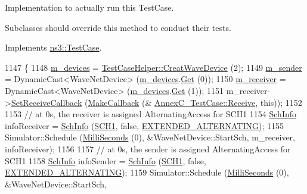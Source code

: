 Implementation to actually run this Test\+Case. 

Subclasses should override this method to conduct their tests. 

Implements \hyperlink{classns3_1_1TestCase_a8ff74680cf017ed42011e4be51917a24}{ns3\+::\+Test\+Case}.


\begin{DoxyCode}
1147 \{
1148   \hyperlink{classAnnexC__TestCase_ab2a998e7df6d23c77fd3a06e203ab925}{m\_devices} = \hyperlink{classTestCaseHelper_a24337801fa036883111fa1968606b57e}{TestCaseHelper::CreatWaveDevice} (2);
1149   \hyperlink{classAnnexC__TestCase_a277f353900b6dbe1e7850814b9f26cdb}{m\_sender} = DynamicCast<WaveNetDevice> (\hyperlink{classAnnexC__TestCase_ab2a998e7df6d23c77fd3a06e203ab925}{m\_devices}.\hyperlink{classns3_1_1NetDeviceContainer_a677d62594b5c9d2dea155cc5045f4d0b}{Get} (0));
1150   \hyperlink{classAnnexC__TestCase_a510f45570e19a81906b9de2c586b89f7}{m\_receiver} = DynamicCast<WaveNetDevice> (\hyperlink{classAnnexC__TestCase_ab2a998e7df6d23c77fd3a06e203ab925}{m\_devices}.\hyperlink{classns3_1_1NetDeviceContainer_a677d62594b5c9d2dea155cc5045f4d0b}{Get} (1));
1151   m\_receiver->\hyperlink{classns3_1_1WaveNetDevice_a98a6505182abba177a0ab348356301d8}{SetReceiveCallback} (\hyperlink{group__makecallbackmemptr_ga9376283685aa99d204048d6a4b7610a4}{MakeCallback} (&
      \hyperlink{classAnnexC__TestCase_a0d034868a04a1e7e7a6fb4c43f34b9db}{AnnexC\_TestCase::Receive}, \textcolor{keyword}{this}));
1152 
1153   \textcolor{comment}{// at 0s, the receiver is assigned AlternatingAccess  for SCH1}
1154   \hyperlink{structns3_1_1SchInfo}{SchInfo} infoReceiver = \hyperlink{structns3_1_1SchInfo}{SchInfo} (\hyperlink{channel-manager_8h_a456a1b730523e5d3b8a29fb227d10028}{SCH1}, \textcolor{keyword}{false}, 
      \hyperlink{channel-scheduler_8h_a0e1f74c3cb8f78904dd1ae957412392e}{EXTENDED\_ALTERNATING});
1155   Simulator::Schedule (\hyperlink{group__timecivil_gaf26127cf4571146b83a92ee18679c7a9}{MilliSeconds} (0), &WaveNetDevice::StartSch, m\_receiver, infoReceiver);
1156 
1157   \textcolor{comment}{// at 0s, the sender is assigned AlternatingAccess for SCH1}
1158   \hyperlink{structns3_1_1SchInfo}{SchInfo} infoSender = \hyperlink{structns3_1_1SchInfo}{SchInfo} (\hyperlink{channel-manager_8h_a456a1b730523e5d3b8a29fb227d10028}{SCH1}, \textcolor{keyword}{false}, 
      \hyperlink{channel-scheduler_8h_a0e1f74c3cb8f78904dd1ae957412392e}{EXTENDED\_ALTERNATING});
1159   Simulator::Schedule (\hyperlink{group__timecivil_gaf26127cf4571146b83a92ee18679c7a9}{MilliSeconds} (0), &WaveNetDevice::StartSch, 

\end{DoxyCode}
